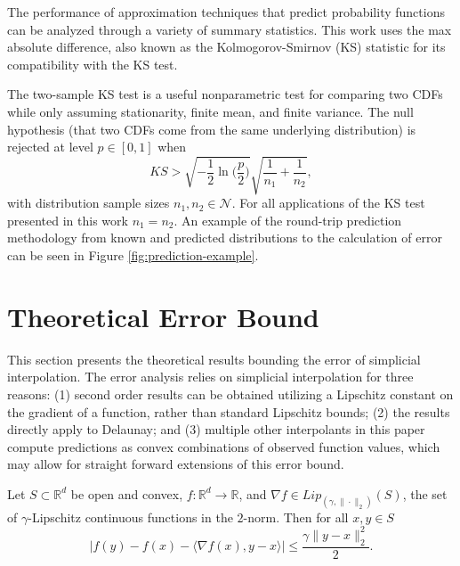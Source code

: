 \documentclass[smallextended,final]{svjour3}       %
\begin{document}
The performance of approximation techniques that predict probability
functions can be analyzed through a variety of summary
statistics. This work uses the max absolute difference, also known as
the Kolmogorov-Smirnov (KS) statistic \cite{lilliefors1967kolmogorov}
for its compatibility with the KS test.

The two-sample KS test is a useful nonparametric test for comparing
two CDFs while only assuming stationarity, finite mean, and finite
variance. The null hypothesis (that two CDFs come from the same
underlying distribution) is rejected at level $p \in [0,1]$ when
$$ KS > \sqrt{-\frac{1}{2}\ln\biggl(\frac{p}{2}\biggr)} \sqrt{\frac{1}{n_1} + \frac{1}{n_2}}, $$
with distribution sample sizes $n_1,n_2 \in \mathcal{N}$. For all
applications of the KS test presented in this work $n_1 = n_2$. An
example of the round-trip prediction methodology from known and
predicted distributions to the calculation of error can be seen in
Figure \ref{fig:prediction-example}.

\section{Theoretical Error Bound}
\label{sec:theory}

This section presents the theoretical results bounding the error of
simplicial interpolation. The error analysis relies on simplicial
interpolation for three reasons: (1) second order results can be
obtained utilizing a Lipschitz constant on the gradient of a function,
rather than standard Lipschitz bounds; (2) the results directly
apply to Delaunay; and (3) multiple other interpolants in this paper
compute predictions as convex combinations of observed function
values, which may allow for straight forward extensions of this error
bound.

\begin{plainlemma}
  \label{lemma:1}
  Let $S \subset \mathbb{R}^d$ be open and convex, $f: \mathbb{R}^d
  \rightarrow \mathbb{R}$, and $\nabla f \in
  Lip_{(\gamma,\|\cdot\|_2)}(S)$, the set of $\gamma$-Lipschitz
  continuous functions in the $2$-norm. Then for all $x,y \in S$
  $$\big|f(y) - f(x) - \langle \nabla f(x), y - x \rangle \big| \leq \frac{\gamma \|y - x\|_2^2}{2}.$$
\end{plainlemma}
\end{document}
